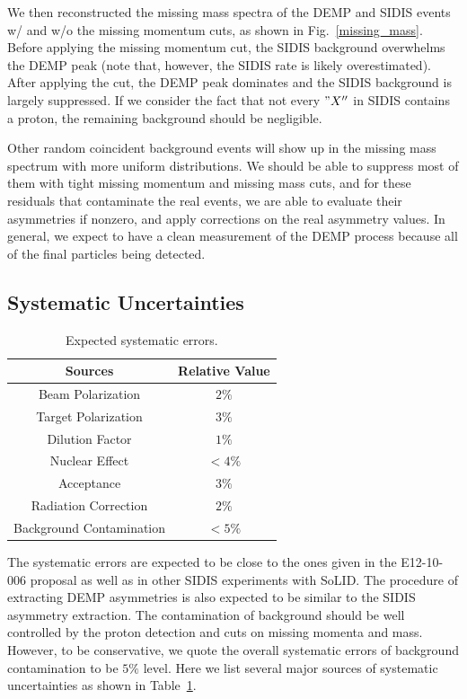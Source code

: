 We then reconstructed the missing mass spectra of the DEMP and SIDIS events w/
and w/o the missing momentum cuts, as shown in Fig.~\ref{missing_mass}. Before
applying the missing momentum cut, the SIDIS background overwhelms the DEMP
peak (note that, however, the SIDIS rate is likely overestimated). After applying the
cut, the DEMP peak dominates and the SIDIS background is largely suppressed. If
we consider the fact that not every $"X''$ in SIDIS contains a proton, the
remaining background should be negligible.

Other random coincident background events will show up in the missing mass
spectrum with more uniform distributions. We should be able to suppress most of
them with tight missing momentum and missing mass cuts, and for these residuals
that contaminate the real events, we are able to evaluate their asymmetries if
nonzero, and apply corrections on the real asymmetry values. In general, we
expect to have a clean measurement of the DEMP process because all of the final
particles being detected.

\subsection{Systematic Uncertainties}

\begin{table}[!htp]
\centering
\begin{tabular}{|c|c|}
\hline
{\bf Sources}            & {\bf Relative Value} \\\hline
Beam Polarization        & $2\%$ \\\hline 
Target Polarization      & $3\%$ \\\hline 
Dilution Factor          & $1\%$ \\\hline 
Nuclear Effect           & $<4\%$ \\\hline 
Acceptance               & $3\%$ \\\hline
Radiation Correction     & $2\%$ \\\hline
Background Contamination & $<5\%$ \\\hline
\end{tabular}
\caption{\footnotesize{Expected systematic errors.}}\label{table:det_sys_err}
\end{table}

The systematic errors are expected to be close to the ones given in the
E12-10-006 proposal as well as in other SIDIS experiments with SoLID. The
procedure of extracting DEMP asymmetries is also expected to be similar to the
SIDIS asymmetry extraction.  The contamination of background should be well
controlled by the proton detection and cuts on missing momenta and mass.
However, to be conservative, we quote the overall systematic errors of
background contamination to be $5\%$ level.  Here we list several major sources
of systematic uncertainties as shown in Table~\ref{table:det_sys_err}.

